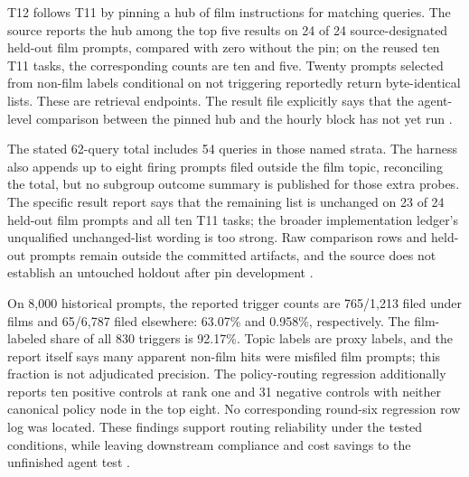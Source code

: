 T12 follows T11 by pinning a hub of film instructions for matching queries. The source reports the hub among the top five results on 24 of 24 source-designated held-out film prompts, compared with zero without the pin; on the reused ten T11 tasks, the corresponding counts are ten and five. Twenty prompts selected from non-film labels conditional on not triggering reportedly return byte-identical lists. These are retrieval endpoints. The result file explicitly says that the agent-level comparison between the pinned hub and the hourly block has not yet run \citep{benchmark_update_t12_result,benchmark_update_t12_compare}.

The stated 62-query total includes 54 queries in those named strata. The harness also appends up to eight firing prompts filed outside the film topic, reconciling the total, but no subgroup outcome summary is published for those extra probes. The specific result report says that the remaining list is unchanged on 23 of 24 held-out film prompts and all ten T11 tasks; the broader implementation ledger's unqualified unchanged-list wording is too strong. Raw comparison rows and held-out prompts remain outside the committed artifacts, and the source does not establish an untouched holdout after pin development \citep{benchmark_update_t12_result,benchmark_update_t12_compare,benchmark_update_round6_landed}.

On 8,000 historical prompts, the reported trigger counts are 765/1,213 filed under films and 65/6,787 filed elsewhere: 63.07\% and 0.958\%, respectively. The film-labeled share of all 830 triggers is 92.17\%. Topic labels are proxy labels, and the report itself says many apparent non-film hits were misfiled film prompts; this fraction is not adjudicated precision. The policy-routing regression additionally reports ten positive controls at rank one and 31 negative controls with neither canonical policy node in the top eight. No corresponding round-six regression row log was located. These findings support routing reliability under the tested conditions, while leaving downstream compliance and cost savings to the unfinished agent test \citep{benchmark_update_t12_result}.


